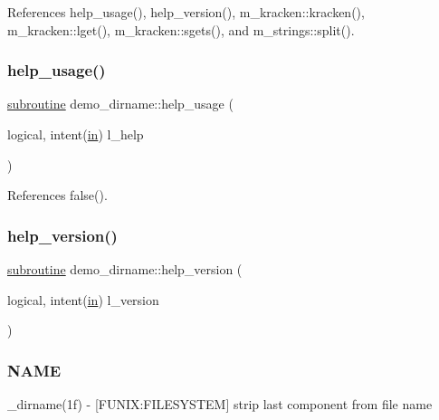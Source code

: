 References help\+\_\+usage(), help\+\_\+version(), m\+\_\+kracken\+::kracken(), m\+\_\+kracken\+::lget(), m\+\_\+kracken\+::sgets(), and m\+\_\+strings\+::split().

\mbox{\label{__dirname_8f90_a3d60364463c9076e431b8d8c043cbd1c}} 
\subsubsection{\texorpdfstring{help\+\_\+usage()}{help\_usage()}}
{\footnotesize\ttfamily \hyperlink{M__stopwatch_83_8txt_acfbcff50169d691ff02d4a123ed70482}{subroutine} demo\+\_\+dirname\+::help\+\_\+usage (\begin{DoxyParamCaption}\item[{logical, intent(\hyperlink{M__journal_83_8txt_afce72651d1eed785a2132bee863b2f38}{in})}]{l\+\_\+help }\end{DoxyParamCaption})}



References false().

\mbox{\label{__dirname_8f90_a948f25e883089a17879425d9c31c64cd}} 
\subsubsection{\texorpdfstring{help\+\_\+version()}{help\_version()}}
{\footnotesize\ttfamily \hyperlink{M__stopwatch_83_8txt_acfbcff50169d691ff02d4a123ed70482}{subroutine} demo\+\_\+dirname\+::help\+\_\+version (\begin{DoxyParamCaption}\item[{logical, intent(\hyperlink{M__journal_83_8txt_afce72651d1eed785a2132bee863b2f38}{in})}]{l\+\_\+version }\end{DoxyParamCaption})}



\subsubsection*{N\+A\+ME}

\+\_\+dirname(1f) -\/ \mbox{[}F\+U\+N\+IX\+:F\+I\+L\+E\+S\+Y\+S\+T\+EM\mbox{]} strip last component from file name 

